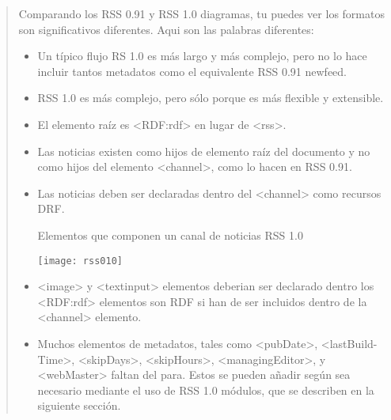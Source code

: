 \blockquote{

Comparando los RSS 0.91 y RSS 1.0 diagramas, tu puedes ver los formatos son significativos diferentes.
Aqui son las palabras diferentes:

\begin{itemize}

\item Un típico flujo RS 1.0 es más largo y más complejo, pero no lo hace incluir tantos metadatos como el
equivalente RSS 0.91 newfeed.

\item RSS 1.0 es más complejo, pero sólo porque es más flexible y extensible.

\item El elemento raíz es <RDF:rdf> en lugar de <rss>.

\item Las noticias existen como hijos de elemento raíz del documento y no como hijos del elemento <channel>,
como lo hacen en RSS 0.91.

\item Las noticias deben ser declaradas dentro del <channel> como recursos DRF. \par

\normalsize

\begin{center}

Elementos que componen un canal de noticias RSS 1.0

\end{center}

\begin{minipage}{1.0\linewidth}
	\texttt{[image: rss010]}
\end{minipage}

\scriptsize

\item <image> y <textinput> elementos deberian ser declarado dentro los <RDF:rdf> elementos son RDF
si han de ser incluidos dentro de la <channel> elemento.

\item Muchos elementos de metadatos, tales como  <pubDate>, <lastBuild-Time>, <skipDays>,
<skipHours>, <managingEditor>, y <webMaster> faltan del para. Estos se pueden añadir según sea necesario
mediante el uso de RSS 1.0 módulos, que se describen en la siguiente sección.\cite{johnson2006rss}

\end{itemize}

}

